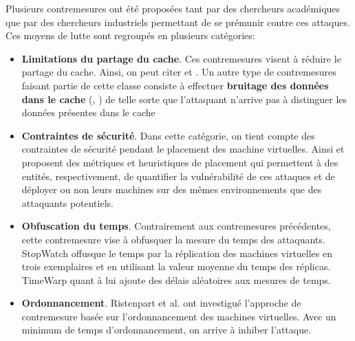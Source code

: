\par 
Plusieurs  contremesures ont été proposées tant par des chercheurs académiques que par  des chercheurs industriels permettant de se prémunir contre ces attaques. Ces moyens de lutte  sont regroupés en plusieurs catégories:
\begin{itemize} 
 \item  \textbf{Limitations du partage du cache}.  Ces contremesures visent à réduire le partage du cache. Ainsi, on peut citer \cite{STEALTHMEM} et \cite{chameleon}. Un autre type de contremesures  faisant partie de cette classe consiste à effectuer  \textbf{bruitage des données dans  le cache} (\cite{duppel}, \cite{Godefrey}) de telle sorte que l’attaquant n’arrive pas à distinguer les données présentes dans le cache
 \item \textbf{Contraintes de sécurité}. Dans cette catégorie, on tient compte des contraintes de sécurité pendant le placement des machine virtuelles. Ainsi  \cite{Lyon1} et \cite{Lyon2}  proposent des métriques et heuristiques de placement  qui permettent à des entités, respectivement, de quantifier la vulnérabilité de ces attaques et de  déployer ou  non  leurs machines sur des mêmes environnements  que des attaquants potentiels. 
 \item  \textbf{Obfuscation du temps}. Contrairement aux contremesures précédentes, cette contremesure  vise à obfusquer la mesure du temps des attaquants.  StopWatch \cite{StopWatch}  offusque le temps par la réplication des  machines virtuelles  en trois exemplaires  et en  utilisant   la valeur moyenne du temps des réplicas. TimeWarp \cite{TimeWarp} quant à lui ajoute des délais aléatoires aux mesures de temps.  
 \item  \textbf{Ordonnancement}. Ristenpart et al. \cite{Ristenpart} ont investigué l’approche de contremesure basée sur l’ordonnancement des machines virtuelles.  Avec un minimum de temps d’ordonnancement, on arrive à inhiber l’attaque.
\end{itemize} \newline{}



